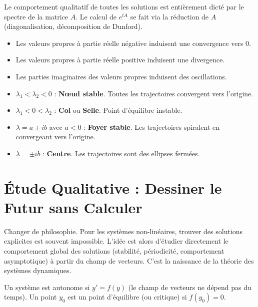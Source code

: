 \begin{remark}
    Le comportement qualitatif de toutes les solutions est entièrement dicté par le spectre de la matrice $A$. Le calcul de $e^{tA}$ se fait via la réduction de $A$ (diagonalisation, décomposition de Dunford).
    \begin{itemize}
        \item Les valeurs propres à partie réelle négative induisent une convergence vers 0.
        \item Les valeurs propres à partie réelle positive induisent une divergence.
        \item Les parties imaginaires des valeurs propres induisent des oscillations.
    \end{itemize}
\end{remark}

\begin{example}[Portraits de phase en dimension 2 pour $Y'=AY$]
    \begin{itemize}
        \item $\lambda_1 < \lambda_2 < 0$ : \textbf{Nœud stable}. Toutes les trajectoires convergent vers l'origine.
        \item $\lambda_1 < 0 < \lambda_2$ : \textbf{Col} ou \textbf{Selle}. Point d'équilibre instable. 
        \item $\lambda = a \pm ib$ avec $a < 0$ : \textbf{Foyer stable}. Les trajectoires spiralent en convergeant vers l'origine. 
        \item $\lambda = \pm ib$ : \textbf{Centre}. Les trajectoires sont des ellipses fermées.
    \end{itemize}
\end{example}

\section{Étude Qualitative : Dessiner le Futur sans Calculer}

\begin{objectif}
    Changer de philosophie. Pour les systèmes non-linéaires, trouver des solutions explicites est souvent impossible. L'idée est alors d'étudier directement le comportement global des solutions (stabilité, périodicité, comportement asymptotique) à partir du champ de vecteurs. C'est la naissance de la théorie des systèmes dynamiques.
\end{objectif}

\begin{definition}
    Un système est autonome si $y' = f(y)$ (le champ de vecteurs ne dépend pas du temps). Un point $y_0$ est un point d'équilibre (ou critique) si $f(y_0)=0$.
\end{definition}

